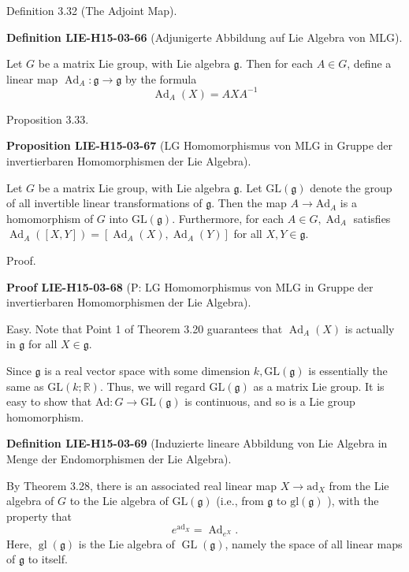 \documentclass[10pt, letterpaper]{article}
\newcommand{\CustomHeading}[3]{%
  \par\medskip\noindent%
  \textbf{#1 #2} \textnormal{(#3)}.\enskip%
}
\newenvironment{DEF}[2]{\begin{unitbox}\CustomHeading{Definition}{#1}{#2}}{\end{unitbox}}
\newenvironment{PROP}[2]{\begin{unitbox}\CustomHeading{Proposition}{#1}{#2}}{\end{unitbox}}
\newenvironment{PROOF}[2]{\begin{unitbox}\CustomHeading{Proof}{#1}{#2}}{\end{unitbox}}
\begin{document}
Definition 3.32 (The Adjoint Map). 


\begin{DEF}{LIE-H15-03-66}{Adjunigerte Abbildung auf Lie Algebra von MLG}
Let $G$ be a matrix Lie group, with Lie algebra $\mathfrak{g}$. Then for each $A \in G$, define a linear map $\operatorname{Ad}_{A}: \mathfrak{g} \rightarrow \mathfrak{g}$ by the formula
$$
\operatorname{Ad}_{A}(X)=A X A^{-1}
$$
\end{DEF}



Proposition 3.33. 


\begin{PROP}{LIE-H15-03-67}{LG Homomorphismus von MLG in Gruppe der invertierbaren Homomorphismen der Lie Algebra}
Let $G$ be a matrix Lie group, with Lie algebra $\mathfrak{g}$. Let $\mathrm{GL}(\mathfrak{g})$ denote the group of all invertible linear transformations of $\mathfrak{g}$. Then the map $A \rightarrow \mathrm{Ad}_{A}$ is a homomorphism of $G$ into $\mathrm{GL}(\mathfrak{g})$. Furthermore, for each $A \in G, \operatorname{Ad}_{A}$ satisfies $\operatorname{Ad}_{A}([X, Y])=\left[\operatorname{Ad}_{A}(X), \operatorname{Ad}_{A}(Y)\right]$ for all $X, Y \in \mathfrak{g}$.
\end{PROP}

Proof. 



\begin{PROOF}{LIE-H15-03-68}{P: LG Homomorphismus von MLG in Gruppe der invertierbaren Homomorphismen der Lie Algebra}
Easy. Note that Point 1 of Theorem 3.20 guarantees that $\operatorname{Ad}_{A}(X)$ is actually in $\mathfrak{g}$ for all $X \in \mathfrak{g}$.


Since $\mathfrak{g}$ is a real vector space with some dimension $k, \mathrm{GL}(\mathfrak{g})$ is essentially the same as $\mathrm{GL}(k ; \mathbb{R})$. Thus, we will regard $\mathrm{GL}(\mathfrak{g})$ as a matrix Lie group. It is easy to
show that $\mathrm{Ad}: G \rightarrow \mathrm{GL}(\mathfrak{g})$ is continuous, and so is a Lie group homomorphism.
\end{PROOF}


\begin{DEF}{LIE-H15-03-69}{Induzierte lineare Abbildung von Lie Algebra in Menge der Endomorphismen der Lie Algebra}
By Theorem 3.28, there is an associated real linear map $X \rightarrow \mathrm{ad}_{X}$ from the Lie algebra of $G$ to the Lie algebra of $\mathrm{GL}(\mathfrak{g})$ (i.e., from $\mathfrak{g}$ to $\mathrm{gl}(\mathfrak{g})$ ), with the property that
$$
e^{\mathrm{ad}_{X}}=\operatorname{Ad}_{e^{X}} .
$$
Here, $\operatorname{gl}(\mathfrak{g})$ is the Lie algebra of $\operatorname{GL}(\mathfrak{g})$, namely the space of all linear maps of $\mathfrak{g}$ to itself.
\end{DEF}
\end{document}
